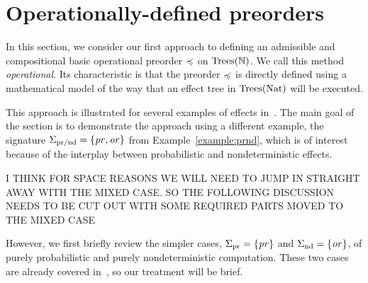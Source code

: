 \section{Operationally-defined preorders}

In this section, we consider our first approach to defining an admissible and compositional basic operational
preorder $\preccurlyeq$ on $\textnormal{Trees}(\mathbb{N})$. We call this method \emph{operational}. Its characteristic is that the preorder
 $\preccurlyeq$ is directly defined using a mathematical model of the way that an effect tree in $\textnormal{Trees}(\mathbb{\textnormal{Nat}})$ will be executed.

This approach is illustrated for several examples of effects in~\cite{gom}. 
The main goal of the section is to demonstrate the approach using a different example, the signature
$\Sigma_{\text{pr/nd}} = \{\operatorname{\mathit{pr}},\operatorname{\mathit{or}}\}$ from Example~\ref{example:prnd}, which is of interest because of the 
interplay between probabilistic and nondeterministic effects. 

I THINK FOR SPACE REASONS WE WILL NEED TO JUMP IN STRAIGHT AWAY WITH THE MIXED CASE. SO THE FOLLOWING DISCUSSION NEEDS TO BE CUT OUT WITH SOME REQUIRED PARTS MOVED TO THE MIXED CASE

However, we first
briefly review the simpler cases, $\Sigma_{\text{pr}} = \{\operatorname{\mathit{pr}}\}$ and $\Sigma_{\text{nd}} = \{\operatorname{\mathit{or}}\}$, of purely probabilistic and 
purely nondeterministic computation. These two cases are already covered in~\cite{gom}, so our treatment will be brief. 

